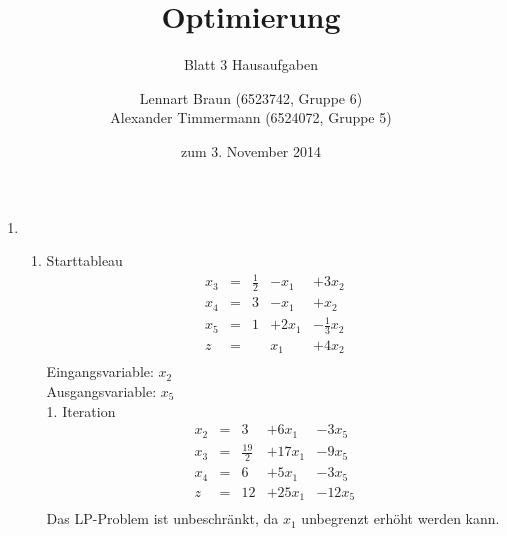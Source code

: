 \documentclass[a4paper]{scrartcl}
\title{Optimierung}
\subtitle{Blatt 3 Hausaufgaben}
\author{
	Lennart Braun (6523742, Gruppe 6) \\
    Alexander Timmermann (6524072, Gruppe 5)
}
\date{zum 3. November 2014}
\begin{document}
\maketitle

\begin{enumerate}
    \item %
        \begin{enumerate}
            \item
                Starttableau
                \begin{equation}
                    \begin{array}{rcrrr}
                        x_3 & = & \frac{1}{2} & -x_1 & +3x_2 \\
                        x_4 & = & 3 & -x_1 & +x_2 \\
                        x_5 & = & 1 & +2x_1 & -\frac{1}{3}x_2 \\
                        \hline
                        z   & = &   & x_1 & +4x_2 \\
                    \end{array}
                \end{equation}
                Eingangsvariable: $x_2$ \\
                Ausgangsvariable: $x_5$ \\

                1. Iteration
                \begin{equation}
                    \begin{array}{rcrrr}
                        x_2 & = & 3 & +6x_1 & -3x_5 \\
                        x_3 & = & \frac{19}{2} & +17x_1 & -9x_5 \\
                        x_4 & = & 6 & +5x_1 & -3x_5 \\
                        \hline
                        z   & = & 12 & +25x_1 & -12x_5 \\
                    \end{array}
                \end{equation}
                Das LP-Problem ist unbeschränkt, da $x_1$ unbegrenzt erhöht
                werden kann.


\end{enumerate}
\end{enumerate}
\end{document}
